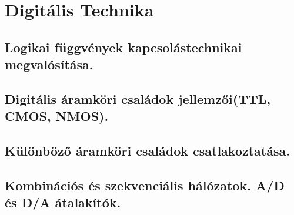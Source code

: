 \section{Digitális Technika}
\subsection{Logikai függvények kapcsolástechnikai megvalósítása.}

\subsection{Digitális áramköri családok jellemzői(TTL, CMOS, NMOS).}

\subsection{Különböző áramköri családok csatlakoztatása.}

\subsection{Kombinációs és szekvenciális hálózatok. A/D és D/A átalakítók.}
